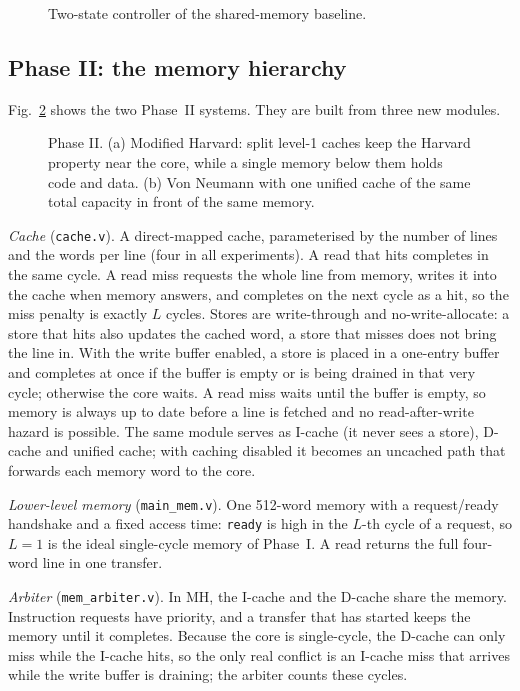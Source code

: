 \documentclass[conference]{IEEEtran}
\begin{document}
\begin{figure}[t]
\centering

\caption{Two-state controller of the shared-memory baseline.}
\label{fig:fsm}
\end{figure}

\subsection{Phase II: the memory hierarchy}
Fig.~\ref{fig:hier} shows the two Phase~II systems. They are built from
three new modules.

\begin{figure}[t]
\centering
\resizebox{\textwidth}{!}{}
\caption{Phase II. (a) Modified Harvard: split level-1 caches keep the Harvard property near the core, while a single memory below them holds code and data. (b) Von Neumann with one unified cache of the same total capacity in front of the same memory.}
\label{fig:hier}
\end{figure}

\emph{Cache} (\texttt{cache.v}). A direct-mapped cache, parameterised by the
number of lines and the words per line (four in all experiments). A read
that hits completes in the same cycle. A read miss requests the whole line
from memory, writes it into the cache when memory answers, and completes on
the next cycle as a hit, so the miss penalty is exactly $L$ cycles. Stores
are write-through and no-write-allocate: a store that hits also updates the
cached word, a store that misses does not bring the line in. With the write
buffer enabled, a store is placed in a one-entry buffer and completes at
once if the buffer is empty or is being drained in that very cycle;
otherwise the core waits. A read miss waits until the buffer is empty, so
memory is always up to date before a line is fetched and no read-after-write
hazard is possible. The same module serves as I-cache (it never sees a
store), D-cache and unified cache; with caching disabled it becomes an
uncached path that forwards each memory word to the core.

\emph{Lower-level memory} (\texttt{main\_mem.v}). One 512-word memory with a
request/ready handshake and a fixed access time: \texttt{ready} is high in
the $L$-th cycle of a request, so $L=1$ is the ideal single-cycle memory of
Phase~I. A read returns the full four-word line in one transfer.

\emph{Arbiter} (\texttt{mem\_arbiter.v}). In MH, the I-cache and the D-cache
share the memory. Instruction requests have priority, and a transfer that
has started keeps the memory until it completes. Because the core is
single-cycle, the D-cache can only miss while the I-cache hits, so the only
real conflict is an I-cache miss that arrives while the write buffer is
draining; the arbiter counts these cycles.
\end{document}
